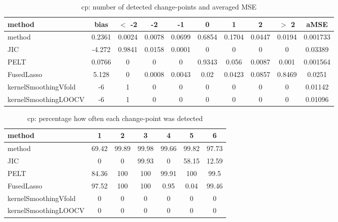 \begin{table}[ht]
\centering
\begin{tabular}{l|c|ccccccc|c}
  \hline
method & bias & $<$ -2 & -2 & -1 & 0 & 1 & 2 & $>$ 2 & aMSE \\ 
  \hline
method & 0.2361 & 0.0024 & 0.0078 & 0.0699 & 0.6854 & 0.1704 & 0.0447 & 0.0194 & 0.001733 \\ 
  JIC & -4.272 & 0.9841 & 0.0158 & 0.0001 &     0 &     0 &     0 &     0 & 0.03389 \\ 
  PELT & 0.0766 &     0 &     0 &     0 & 0.9343 & 0.056 & 0.0087 & 0.001 & 0.001564 \\ 
  FusedLasso & 5.128 &     0 & 0.0008 & 0.0043 &  0.02 & 0.0423 & 0.0857 & 0.8469 & 0.0251 \\ 
  kernelSmoothingVfold &    -6 &     1 &     0 &     0 &     0 &     0 &     0 &     0 & 0.01142 \\ 
  kernelSmoothingLOOCV &    -6 &     1 &     0 &     0 &     0 &     0 &     0 &     0 & 0.01096 \\ 
   \hline
\end{tabular}
\caption{cp: number of detected change-points and averaged MSE} 
\label{tab:cpNjumps}
\end{table}
\begin{table}[ht]
\centering
\begin{tabular}{l|cccccc}
  \hline
method & 1 & 2 & 3 & 4 & 5 & 6 \\ 
  \hline
method &  69.42 &  99.89 &  99.98 &  99.66 &  99.82 &  97.73 \\ 
  JIC &      0 &      0 &  99.93 &      0 &  58.15 &  12.59 \\ 
  PELT &  84.36 &    100 &    100 &  99.91 &    100 &   99.5 \\ 
  FusedLasso &  97.52 &    100 &    100 &   0.95 &   0.04 &  99.46 \\ 
  kernelSmoothingVfold &      0 &      0 &      0 &      0 &      0 &      0 \\ 
  kernelSmoothingLOOCV &      0 &      0 &      0 &      0 &      0 &      0 \\ 
   \hline
\end{tabular}
\caption{cp: percentage how often each change-point was detected} 
\label{tab:cpDetections}
\end{table}
